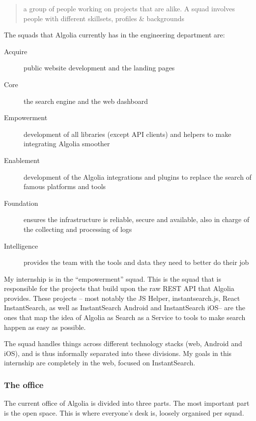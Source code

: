 \begin{quotation}
  a group of people working on projects that are alike. A squad involves people with different skillsets, profiles \& backgrounds
\end{quotation}

The squads that Algolia currently has in the engineering department are:

\begin{description}
  \item[Acquire] public website development and the landing pages
  \item[Core] the search engine and the web dashboard
  \item[Empowerment] development of all libraries (except API clients) and helpers to make integrating Algolia smoother
  \item[Enablement] development of the Algolia integrations and plugins to replace the search of famous platforms and tools
  \item[Foundation] ensures the infrastructure is reliable, secure and available, also in charge of the collecting and processing of logs
  \item[Intelligence] provides the team with the tools and data they need to better do their job
\end{description}

My internship is in the ``empowerment'' squad. This is the squad that is responsible for the projects that build upon the raw REST API that Algolia provides. These projects -- most notably the JS Helper\cite{algolia-js-helper}, instantsearch.js\cite{instantsearch-js}, React InstantSearch\cite{react-instantsearch}, as well as InstantSearch Android\cite{instantsearch-android} and InstantSearch iOS\cite{instantsearch-ios}-- are the ones that map the idea of Algolia as Search as a Service to tools to make search happen as easy as possible.

The squad handles things across different technology stacks (web, Android and iOS), and is thus informally separated into these divisions. My goals in this internship are completely in the web, focused on InstantSearch.

\subsubsection{The office} %
\label{ssub:the_office}

The current office of Algolia is divided into three parts. The most important part is the open space. This is where everyone's desk is, loosely organised per squad.

